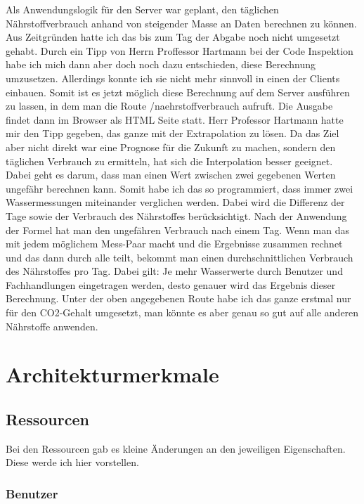 Als Anwendungslogik für den Server war geplant, den täglichen Nährstoffverbrauch anhand von steigender Masse an Daten berechnen zu können. Aus Zeitgründen hatte ich das bis zum Tag der Abgabe noch nicht umgesetzt gehabt. Durch ein Tipp von Herrn Proffessor Hartmann bei der Code Inspektion habe ich mich dann aber doch noch dazu entschieden, diese Berechnung umzusetzen. Allerdings konnte ich sie nicht mehr sinnvoll in einen der Clients einbauen. Somit ist es jetzt möglich diese Berechnung auf dem Server ausführen zu lassen, in dem man die Route /naehrstoffverbrauch aufruft. Die Ausgabe findet dann im Browser als HTML Seite statt. Herr Professor Hartmann hatte mir den Tipp gegeben, das ganze mit der Extrapolation zu lösen. Da das Ziel aber nicht direkt war eine Prognose für die Zukunft zu machen, sondern den täglichen Verbrauch zu ermitteln, hat sich die Interpolation besser geeignet. Dabei geht es darum, dass man einen Wert zwischen zwei gegebenen Werten ungefähr berechnen kann. Somit habe ich das so programmiert, dass immer zwei Wassermessungen miteinander verglichen werden. Dabei wird die Differenz der Tage sowie der Verbrauch des Nährstoffes berücksichtigt. Nach der Anwendung der Formel hat man den ungefähren Verbrauch nach einem Tag. Wenn man das mit jedem möglichem Mess-Paar macht und die Ergebnisse zusammen rechnet und das dann durch alle teilt, bekommt man einen durchschnittlichen Verbrauch des Nährstoffes pro Tag. Dabei gilt: Je mehr Wasserwerte durch Benutzer und Fachhandlungen eingetragen werden, desto genauer wird das Ergebnis dieser Berechnung. Unter der oben angegebenen Route habe ich das ganze erstmal nur für den CO2-Gehalt umgesetzt, man könnte es aber genau so gut auf alle anderen Nährstoffe anwenden.

\section{Architekturmerkmale}

\subsection{Ressourcen}

Bei den Ressourcen gab es kleine Änderungen an den jeweiligen Eigenschaften. Diese werde ich hier vorstellen.

\subsubsection{Benutzer}


